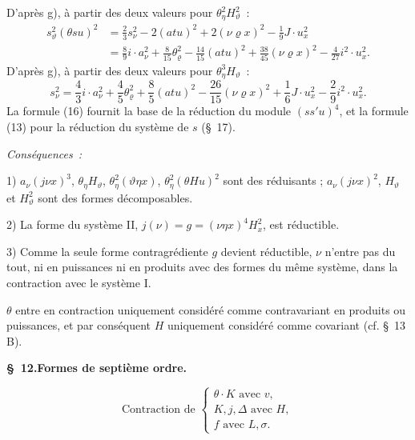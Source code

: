 \documentclass[11pt]{article}
\newcommand{\A}{\Delta}
\newcommand{\R}{\varrho}
\begin{document}
D'après g), à partir des deux valeurs pour $\theta_\eta^2H_\vartheta^2$ :
\[
\tag{15}
\begin{aligned}
s_\vartheta^2(\theta su)^2
&=\frac23s_\nu^2-2(atu)^2+2(\nu\R x)^2-\frac19J\cdot u_x^2\\
&=\frac89i\cdot a_\nu^2+\frac8{15}\theta_\R^2-\frac{14}{15}(atu)^2+\frac{38}{45}(\nu\R x)^2-\frac4{27}i^2\cdot u_x^2.
\end{aligned}
\]
D'après g), à partir des deux valeurs pour $\theta_\eta^3H_\vartheta$ :
\[
\tag{16}
s_\nu^2=\frac43i\cdot a_\nu^2+\frac45\theta_\R^2+\frac85(atu)^2-\frac{26}{15}(\nu\R x)^2+\frac16J\cdot u_x^2-\frac29i^2\cdot u_x^2.
\]
La formule (16) fournit la base de la réduction du module $(ss'u)^4$, et la formule (13) pour la réduction du système de $s$ (\S\ 17).

\noindent\emph{Conséquences :}

1) $a_\nu(j\nu x)^3$, $\theta_\eta H_\vartheta$, $\theta_\eta^2(\vartheta\eta x)$, $\theta_\eta^2(\theta Hu)^2$ sont des réduisants ; $a_\nu(j\nu x)^2$, $H_\vartheta$ et $H_\vartheta^2$ sont des formes décomposables.

2) La forme du système II, $j(\nu)=g=(\nu\eta x)^4H_x^2$, est réductible.

3) Comme la seule forme contragrédiente $g$ devient réductible, $\nu$ n'entre pas du tout, ni en puissances ni en produits avec des formes du même système, dans la contraction avec le système I.

$\theta$ entre en contraction uniquement considéré comme contravariant en produits ou puissances, et par conséquent $H$ uniquement considéré comme covariant (cf. \S\ 13 B).

\clearpage

\begin{center}
\textbf{\S\ 12.\quad Formes de septième ordre.}
\end{center}
\[
\text{Contraction de }\left\{\begin{array}{l}
\theta\cdot K\text{ avec }v,\\
K,j,\A\text{ avec }H,\\
f\text{ avec }L,\sigma.
\end{array}\right.
\]
\end{document}
